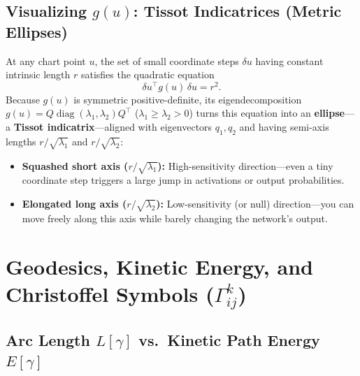 \documentclass[11pt,a4paper]{article}
\DeclareMathOperator{\diag}{diag}
\theoremstyle{definition}
\begin{document}
\subsection{Visualizing \texorpdfstring{$g(u)$}{g(u)}: Tissot Indicatrices (Metric Ellipses)}

At any chart point $u$, the set of small coordinate steps $\delta u$ having constant intrinsic length $r$ satisfies the quadratic equation
\[
    \delta u^\top g(u)\,\delta u = r^2.
\]
Because $g(u)$ is symmetric positive-definite, its eigendecomposition $g(u) = Q\diag(\lambda_1, \lambda_2)Q^\top$ ($\lambda_1 \ge \lambda_2 > 0$) turns this equation into an \textbf{ellipse}---a \textbf{Tissot indicatrix}---aligned with eigenvectors $q_1, q_2$ and having semi-axis lengths $r / \sqrt{\lambda_1}$ and $r / \sqrt{\lambda_2}$:
\begin{itemize}[leftmargin=*]
    \item \textbf{Squashed short axis ($r / \sqrt{\lambda_1}$):} High-sensitivity direction---even a tiny coordinate step triggers a large jump in activations or output probabilities.
    \item \textbf{Elongated long axis ($r / \sqrt{\lambda_2}$):} Low-sensitivity (or null) direction---you can move freely along this axis while barely changing the network's output.
\end{itemize}

\section{Geodesics, Kinetic Energy, and Christoffel Symbols (\texorpdfstring{$\Gamma^k_{ij}$}{Gamma})}
\label{sec:geodesics}

\subsection{Arc Length \texorpdfstring{$L[\gamma]$}{L} vs.\ Kinetic Path Energy \texorpdfstring{$E[\gamma]$}{E}}
\end{document}
